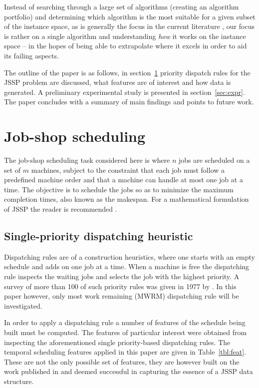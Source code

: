 \documentclass[10pt]{llncs} %
\begin{document}
Instead of searching through a large set of algorithms (creating an algorithm portfolio) and determining which algorithm is the most suitable for a given subset of the instance space, as is generally the focus in the current literature \cite{Smith-miles2009,Smith-miles2010,Corne2011}, our focus is rather on a single algorithm and understanding \emph{how} it works on the instance space -- in the hopes of being able to extrapolate where it excels in order to aid its failing aspects.

The outline of the paper is as follows, in section~\ref{sec:JSSP} priority dispatch rules for the JSSP problem are discussed, what features are of interest and how data is generated. %
A preliminary experimental study is presented in section~\ref{sec:expr}. The paper concludes with a summary of main findings and points to future work.

\section{Job-shop scheduling}\label{sec:JSSP}
The job-shop scheduling task considered here is where $n$ jobs are scheduled on a set of $m$ machines, subject to the constraint that each job must follow a predefined machine order and that a machine can handle at most one job at a time. 
The objective is to schedule the jobs so as to minimize the maximum completion times, also known as the makespan.  For a mathematical formulation of JSSP the reader is recommended \cite{Ingimundardottir2010}. 

\subsection{Single-priority dispatching heuristic}
Dispatching rules are of a construction heuristics, where one starts with an empty schedule and adds on one job at a time. When a machine is free the dispatching rule inspects the waiting jobs and selects the job with the highest priority. A survey of more than 100 of such priority rules was given in 1977 by \cite{Panwalkar1977a}. In this paper however, only most work remaining (MWRM) dispatching rule will be investigated.

In order to apply a dispatching rule a number of features of the schedule being built must be computed. The features of particular interest were obtained from inspecting the aforementioned single priority-based dispatching rules. The temporal scheduling features applied in this paper are given in Table~\ref{tbl:feat}. %
These are not the only possible set of features, they are however built on the work published in \cite{Ingimundardottir2010,Smith-miles2009} and deemed successful in capturing the essence of a JSSP data structure.
\end{document}
